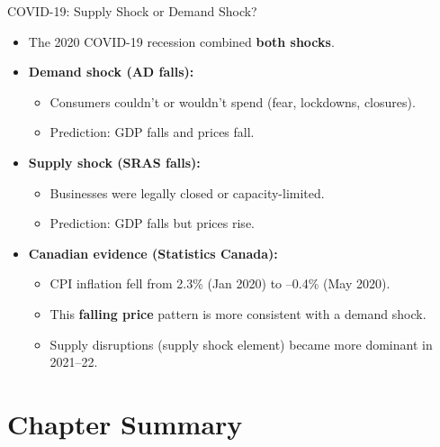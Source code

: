 \documentclass[aspectratio=169]{beamer}
\begin{document}
\begin{frame}{COVID-19: Supply Shock or Demand Shock?}
\transfade
\begin{itemize}[<+->]
  \item The 2020 COVID-19 recession combined \textbf{both shocks}.
  \item \textbf{Demand shock (AD falls):}
  \begin{itemize}[<+->]
    \item Consumers couldn't or wouldn't spend (fear, lockdowns, closures).
    \item Prediction: GDP falls \alert{and} prices fall.
  \end{itemize}
  \item \textbf{Supply shock (SRAS falls):}
  \begin{itemize}[<+->]
    \item Businesses were legally closed or capacity-limited.
    \item Prediction: GDP falls \alert{but} prices rise.
  \end{itemize}
  \item \textbf{Canadian evidence (Statistics Canada):}
  \begin{itemize}[<+->]
    \item CPI inflation fell from 2.3\% (Jan 2020) to \alert{--0.4\%} (May 2020).
    \item This \textbf{falling price} pattern is more consistent with a \textcolor{leafgreen}{demand shock}.
    \item Supply disruptions (supply shock element) became more dominant in 2021--22.
  \end{itemize}
\end{itemize}
\end{frame}

\section*{Chapter Summary}
\end{document}
